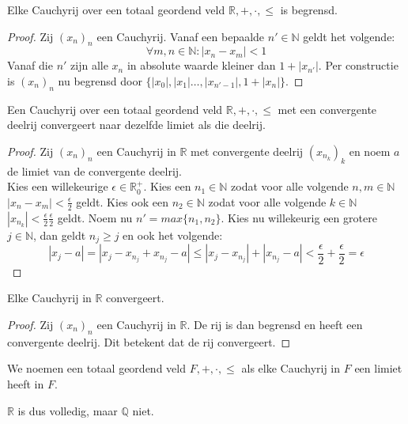\documentclass[main.tex]{subfiles}
\begin{document}
\begin{bpr}
  \label{pr:cauchyrij-begrensd}
  Elke Cauchyrij over een totaal geordend veld $\mathbb{R},+,\cdot,\le$ is begrensd.

  \begin{proof}
    Zij $(x_{n})_{n}$ een Cauchyrij.
    Vanaf een bepaalde $n'\in \mathbb{N}$ geldt het volgende:
    \[ \forall m,n \in \mathbb{N}: |x_{n}-x_{m}| < 1 \]
    Vanaf die $n'$ zijn alle $x_{n}$ in absolute waarde kleiner dan $1+|x_{n'}|$.
    Per constructie is $(x_{n})_{n}$ nu begrensd door $\{ |x_{0}|, |x_{1}| \dotsc, |x_{n'-1}|, 1+|x_{n}| \}$.
  \end{proof}
\end{bpr} 

\begin{bpr}
  \label{pr-cauchyrij-met-convergente-deelrij-convergeert}
  Een Cauchyrij over een totaal geordend veld $\mathbb{R},+,\cdot,\le$ met een convergente deelrij convergeert naar dezelfde limiet als die deelrij.

  \begin{proof}
    Zij $(x_{n})_{n}$ een Cauchyrij in $\mathbb{R}$ met convergente deelrij $(x_{n_{k}})_{k}$ en noem $a$ de limiet van de convergente deelrij.\\
    Kies een willekeurige $\epsilon \in \mathbb{R}_{0}^{+}$.
    Kies een $n_{1} \in \mathbb{N}$ zodat voor alle volgende $n,m\in\mathbb{N}$ $|x_{n}-x_{m}| < \frac{\epsilon}{2}$ geldt.
    Kies ook een $n_{2} \in \mathbb{N}$ zodat voor alle volgende $k\in\mathbb{N}$ $|x_{n_{k}}| < \frac{\epsilon}{2} \frac{\epsilon}{2}$ geldt.
    Noem nu $n' = max\{n_{1},n_{2}\}$.
    Kies nu willekeurig een grotere $j\in \mathbb{N}$, dan geldt $n_{j} \ge j$ en ook het volgende:
    \[ |x_{j} - a| = |x_{j}-x_{n_{j}}+x_{n_{j}}-a| \le |x_{j}-x_{n_{j}}|+|x_{n_{j}}-a| < \frac{\epsilon}{2} + \frac{\epsilon}{2} = \epsilon \]
  \end{proof}
\end{bpr}

\begin{bpr}
  \label{pr:cauchyrij-in-R-convergeert}
  Elke Cauchyrij in $\mathbb{R}$ convergeert.

  \begin{proof}
    Zij $(x_{n})_{n}$ een Cauchyrij in $\mathbb{R}$.
    De rij is dan begrensd en heeft een convergente deelrij.
    Dit betekent dat de rij convergeert.
  \end{proof}
\end{bpr}

\begin{de}
  We noemen een totaal geordend veld $F,+,\cdot,\le$  als elke Cauchyrij in $F$ een limiet heeft in $F$.
\end{de}

\begin{opm}
  $\mathbb{R}$ is dus volledig, maar $\mathbb{Q}$ niet.
\end{opm}

\end{document}
